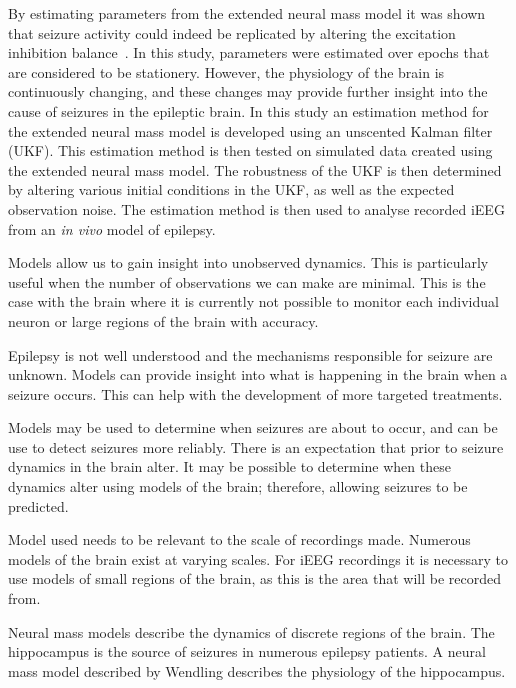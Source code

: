 By estimating parameters from the extended neural mass model it was shown that seizure activity could indeed be replicated by altering the excitation inhibition balance~\cite{wendling2005interictal}. In this study, parameters were estimated over epochs that are considered to be stationery. However, the physiology of the brain is continuously changing, and these changes may provide further insight into the cause of seizures in the epileptic brain. In this study an estimation method for the extended neural mass model is developed using an unscented Kalman filter (UKF). This estimation method is then tested on simulated data created using the extended neural mass model. The robustness of the UKF is then determined by altering various initial conditions in the UKF, as well as the expected observation noise. The estimation method is then used to analyse recorded iEEG from an \textsl{in vivo} model of epilepsy. 


Models allow us to gain insight into unobserved dynamics. 
	This is particularly useful when the number of observations we can make are minimal.
	This is the case with the brain where it is currently not possible to monitor each individual neuron or large regions of the brain with accuracy.

Epilepsy is not well understood and the mechanisms responsible for seizure are unknown.
	Models can provide insight into what is happening in the brain when a seizure occurs.
	This can help with the development of more targeted treatments.
	
Models may be used to determine when seizures are about to occur, and can be use to detect seizures more reliably.
	There is an expectation that prior to seizure dynamics in the brain alter.
	It may be possible to determine when these dynamics alter using models of the brain; therefore, allowing seizures to be predicted.

Model used needs to be relevant to the scale of recordings made.
	Numerous models of the brain exist at varying scales.
	For iEEG recordings it is necessary to use models of small regions of the brain, as this is the area that will be recorded from.
	
Neural mass models describe the dynamics of discrete regions of the brain.
	The hippocampus is the source of seizures in numerous epilepsy patients.
	A neural mass model described by Wendling describes the physiology of the hippocampus.

